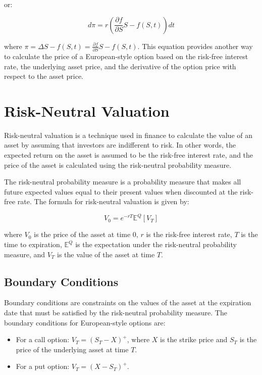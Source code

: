 \documentclass{article}
\theoremstyle{mytheoremstyle}
\theoremstyle{mytheoremstyle}
\theoremstyle{myproblemstyle}
\begin{document}
or:

\begin{equation}
d\pi = r\left(\frac{\partial f}{\partial S}S - f(S,t)\right)dt
\end{equation}

where $\pi = \Delta S - f(S,t) = \frac{\partial f}{\partial S}S - f(S,t)$. This equation provides another way to calculate the price of a European-style option based on the risk-free interest rate, the underlying asset price, and the derivative of the option price with respect to the asset price.


\section{Risk-Neutral Valuation}

Risk-neutral valuation is a technique used in finance to calculate the value of an asset by assuming that investors are indifferent to risk. In other words, the expected return on the asset is assumed to be the risk-free interest rate, and the price of the asset is calculated using the risk-neutral probability measure.

The risk-neutral probability measure is a probability measure that makes all future expected values equal to their present values when discounted at the risk-free rate. The formula for risk-neutral valuation is given by:

\begin{equation}
V_0 = e^{-rT} \mathbb{E}^Q[V_T]
\end{equation}

where $V_0$ is the price of the asset at time 0, $r$ is the risk-free interest rate, $T$ is the time to expiration, $\mathbb{E}^Q$ is the expectation under the risk-neutral probability measure, and $V_T$ is the value of the asset at time $T$.

\subsection{Boundary Conditions}

Boundary conditions are constraints on the values of the asset at the expiration date that must be satisfied by the risk-neutral probability measure. The boundary conditions for European-style options are:

\begin{itemize}
\item For a call option: $V_T = (S_T - X)^+$, where $X$ is the strike price and $S_T$ is the price of the underlying asset at time $T$.
\item For a put option: $V_T = (X - S_T)^+$.
\end{itemize}
\end{document}
